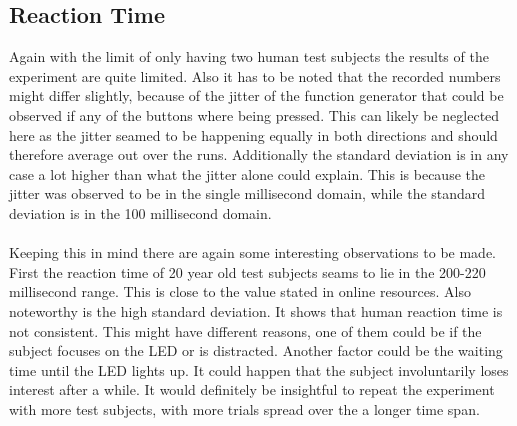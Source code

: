 \documentclass[fleqn,14pt]{article}
\begin{document}
\subsection{Reaction Time}
Again with the limit of only having two human test subjects the results of the experiment are quite limited.
Also it has to be noted that the recorded numbers might differ slightly, because of the jitter of the function
generator that could be observed if any of the buttons where being pressed. This can likely be neglected
here as the jitter seamed to be happening equally in both directions and should therefore average out
over the runs. Additionally the standard deviation is in any case a lot higher than what the jitter alone
could explain. This is because the jitter was observed to be in the single millisecond domain, while the
standard deviation is in the 100 millisecond domain.\\
\\
Keeping this in mind there are again some interesting observations to be made. First the reaction time of 20
year old test subjects seams to lie in the 200-220 millisecond range. This is close to the value stated in
online resources. Also noteworthy is the high standard deviation. It shows that human reaction time is not
consistent. This might have different reasons, one of them could be if the subject focuses on the LED
or is distracted. Another factor could be the waiting time until the LED lights up. It could happen that the
subject involuntarily loses interest after a while. It would definitely be insightful to repeat the experiment
with more test subjects, with more trials spread over the a longer time span.
\end{document}
